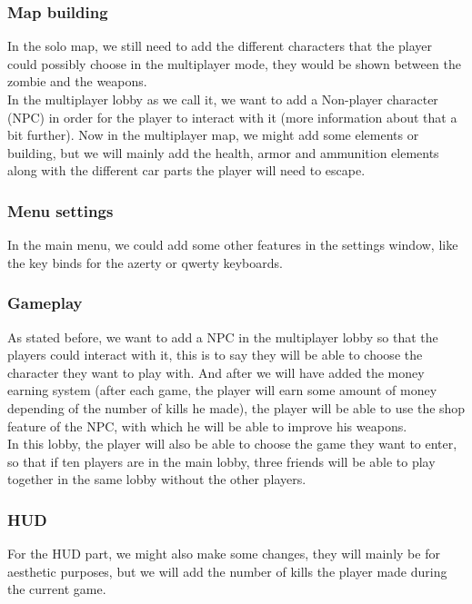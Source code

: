 \documentclass[12pt]{article}
\begin{document}
    \subsubsection{Map building}
    
    	In the solo map, we still need to add the different characters that the player could possibly choose in the multiplayer mode, they would be shown between the zombie and the weapons.\\
        In the \guillemotleft \space multiplayer lobby \guillemotright \space as we call it, we want to add a \guillemotleft \space Non-player character \guillemotright \space (NPC) in order for the player to interact with it (more information about that a bit further).
        Now in the multiplayer map, we might add some elements or building, but we will mainly add the health, armor and ammunition elements along with the different car parts the player will need to escape.
\bigskip
    \subsubsection{Menu settings}
    
    	In the main menu, we could add some other features in the settings window, like the key binds for the azerty or qwerty keyboards.
\bigskip 
    \subsubsection{Gameplay}
    	
        As stated before, we want to add a NPC in the multiplayer lobby so that the players could interact with it, this is to say they will be able to choose the character they want to play with. And after we will have added the \guillemotleft \space money earning \guillemotright \space system (after each game, the player will earn some amount of money depending of the number of kills he made), the player will be able to use the shop feature of the NPC, with which he will be able to improve his weapons.\\
        In this lobby, the player will also be able to choose the game they want to enter, so that if ten players are in the main lobby, three friends will be able to play together in the same lobby without the other players.
\bigskip   
    \subsubsection{HUD}
        
    	For the HUD part, we might also make some changes, they will mainly be for aesthetic purposes, but we will add the number of kills the player made during the current game. 
        
\end{document}
